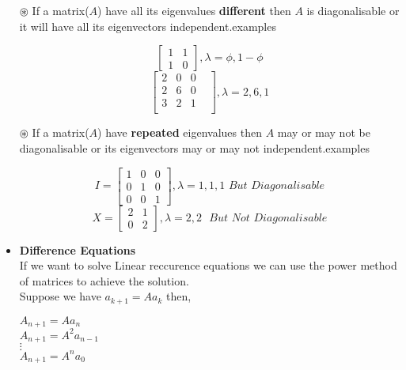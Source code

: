 \documentclass[a4paper,11pt]{article}
\numberwithin{equation}{section}
\begin{document}
\begin{itemize}
$\circledast$ If a matrix($A$) have all its eigenvalues \textbf{different} then $A$ is diagonalisable or it will have all its eigenvectors independent.examples
\begin{center}
    \[\begin{bmatrix}
            1&1\\1&0
        \end{bmatrix},\lambda=\phi,1-\phi
    \]
    \[
        \begin{bmatrix}
        2&0&0\\2&6&0&\\3&2&1\\
        \end{bmatrix},\lambda=2,6,1
    \]
\end{center}
$\circledast$ If a matrix($A$) have \textbf{repeated} eigenvalues then $A$ may or may not be diagonalisable or its eigenvectors may or may not independent.examples
\begin{center}
    \[I=
    \begin{bmatrix}
        1&0&0\\0&1&0\\0&0&1
    \end{bmatrix},\lambda =1,1,1 \hspace{4pt} But\hspace{4pt} Diagonalisable
    \]
    \[
    X=
    \begin{bmatrix}
        2&1\\0&2
    \end{bmatrix},\lambda=2,2\hspace{4pt} \hspace{4pt} But\hspace{4pt} Not\hspace{4pt}Diagonalisable
    \]
\end{center}

\item \textbf{Difference Equations}\\

If we want to solve Linear reccurence equations we can use the power method of matrices to achieve the solution.\\

Suppose we have $a_{k+1}=Aa_k$ then,
\begin{center}
    $A_{n+1}=Aa_{n}$\\
    $A_{n+1}=A^2a_{n-1}$\\
    $\vdots$\\
    $A_{n+1}=A^na_0$
\end{center}


\end{itemize}
\end{document}
